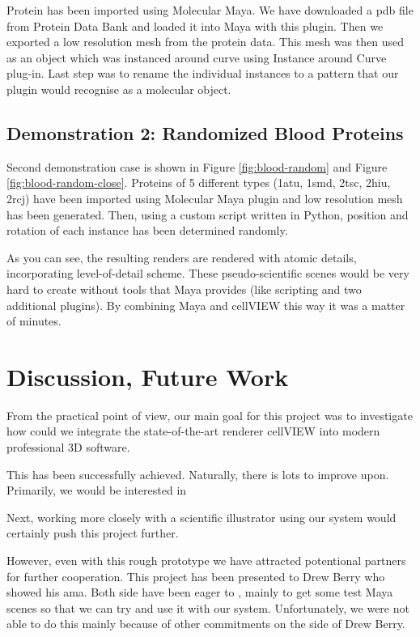 \documentclass[
  digital, %
  table,   %
  nolof,     %
  nolot,     %
  oneside,
]{fithesis3}
\begin{document}
Protein has been imported using Molecular Maya. We have downloaded a pdb file from Protein Data Bank and loaded it into Maya with this plugin. Then we exported a low resolution mesh from the protein data. This mesh was then used as an object which was instanced around curve using Instance around Curve plug-in. Last step was to rename the individual instances to a pattern that our plugin would recognise as a molecular object.

\section{Demonstration 2: Randomized Blood Proteins}
Second demonstration case is shown in Figure \ref{fig:blood-random} and Figure \ref{fig:blood-random-close}. Proteins of 5 different types (1atu, 1smd, 2tsc, 2hiu, 2rcj) have been imported using Molecular Maya plugin and low resolution mesh has been generated. Then, using a custom script written in Python, position and rotation of each instance has been determined randomly.

As you can see, the resulting renders are rendered with atomic details, incorporating level-of-detail scheme. These pseudo-scientific scenes would be very hard to create without tools that Maya provides (like scripting and two additional plugins). By combining Maya and cellVIEW this way it was a matter of minutes.

\chapter{Discussion, Future Work}
\label{chap:discussion}
From the practical point of view, our main goal for this project was to investigate how could we integrate the state-of-the-art renderer cellVIEW into modern professional 3D software.

This has been successfully achieved. Naturally, there is lots to improve upon. Primarily, we would be interested in

Next, working more closely with a scientific illustrator using our system would certainly push this project further.

However, even with this rough prototype we have attracted potentional partners for further cooperation. This project has been presented to Drew Berry who showed his ama. Both side have been eager to , mainly to get some test Maya scenes so that we can try and use it with our system. Unfortunately, we were not able to do this mainly because of other commitments on the side of Drew Berry.
\end{document}
